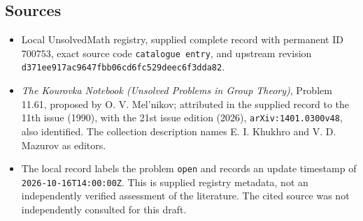 \documentclass[11pt]{article}
\begin{document}
\subsection{Sources}
\begin{itemize}
\item Local UnsolvedMath registry, supplied complete record with permanent ID \(700753\), exact source code \texttt{catalogue entry}, and upstream revision \texttt{d371ee917ac9647fbb06cd6fc529deec6f3dda82}.
\item \emph{The Kourovka Notebook (Unsolved Problems in Group Theory)}, Problem 11.61, proposed by O. V. Mel'nikov; attributed in the supplied record to the 11th issue (1990), with the 21st issue edition (2026), \texttt{arXiv:1401.0300v48}, also identified. The collection description names E. I. Khukhro and V. D. Mazurov as editors.
\item The local record labels the problem \texttt{open} and records an update timestamp of \texttt{2026-10-16T14:00:00Z}. This is supplied registry metadata, not an independently verified assessment of the literature. The cited source was not independently consulted for this draft.
\end{itemize}
\end{document}
